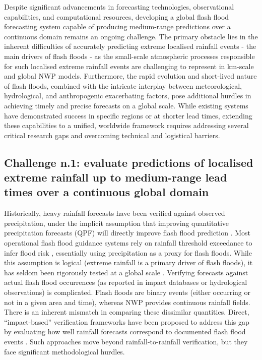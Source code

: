 Despite significant advancements in forecasting technologies, observational capabilities, and computational resources, developing a global flash flood forecasting system capable of producing medium-range predictions over a continuous domain remains an ongoing challenge. The primary obstacle lies in the inherent difficulties of accurately predicting extreme localised rainfall events - the main drivers of flash floods - as the small-scale atmospheric processes responsible for such localised extreme rainfall events are challenging to represent in km-scale and global NWP models. Furthermore, the rapid evolution and short-lived nature of flash floods, combined with the intricate interplay between meteorological, hydrological, and anthropogenic exacerbating factors, pose additional hurdles in achieving timely and precise forecasts on a global scale. While existing systems have demonstrated success in specific regions or at shorter lead times, extending these capabilities to a unified, worldwide framework requires addressing several critical research gaps and overcoming technical and logistical barriers.


\subsection{Challenge n.1: evaluate predictions of localised extreme rainfall up to medium-range lead times over a continuous global domain}

Historically, heavy rainfall forecasts have been verified against observed precipitation, under the implicit assumption that improving quantitative precipitation forecasts (QPF) will directly improve flash flood prediction \citep{Herman2018}. Most operational flash flood guidance systems rely on rainfall threshold exceedance to infer flood risk \citep{Georgakakos2006}, essentially using precipitation as a proxy for flash floods. While this assumption is logical (extreme rainfall is a primary driver of flash floods), it has seldom been rigorously tested at a global scale \citep{Herman2018}. Verifying forecasts against actual flash flood occurrences (as reported in impact databases or hydrological observations) is complicated. Flash floods are binary events (either occurring or not in a given area and time), whereas NWP provides continuous rainfall fields. There is an inherent mismatch in comparing these dissimilar quantities. Direct, “impact-based” verification frameworks have been proposed to address this gap by evaluating how well rainfall forecasts correspond to documented flash flood events \citep{Ntelekos2006,CharpentierNoyer2023}. Such approaches move beyond rainfall-to-rainfall verification, but they face significant methodological hurdles.


